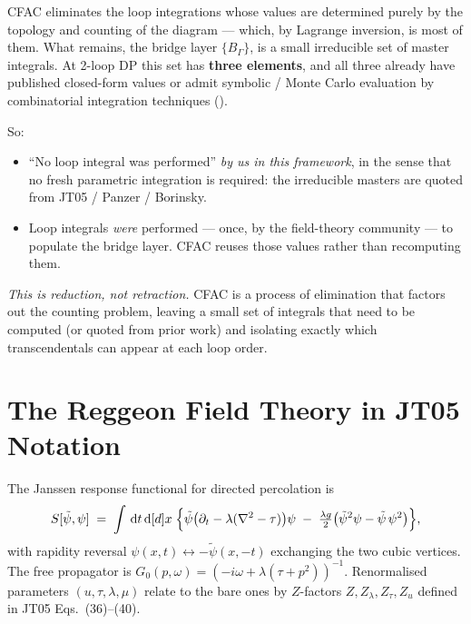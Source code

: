 \documentclass[11pt,a4paper]{article}
\newcommand{\Sact}{S}
\newcommand{\psidag}{\tilde\psi}
\renewcommand{\dd}[1]{\,\mathrm{d}#1}
\theoremstyle{definition}
\theoremstyle{plain}
\begin{document}
\begin{cfacbox}
CFAC eliminates the loop integrations whose values are determined
purely by the topology and counting of the diagram --- which, by
Lagrange inversion, is most of them.  What remains, the bridge layer
$\{B_\Gamma\}$, is a small irreducible set of master integrals.  At
2-loop DP this set has \textbf{three elements}, and all three already
have published closed-form values
\cite{JanssenTauber2005,Tauber2014} or admit symbolic / Monte Carlo
evaluation by combinatorial integration techniques
().

So:
\begin{itemize}[leftmargin=2em]
  \item ``No loop integral was performed'' \emph{by us in this
    framework}, in the sense that no fresh parametric integration is
    required: the irreducible masters are quoted from JT05 / Panzer /
    Borinsky.
  \item Loop integrals \emph{were} performed --- once, by the
    field-theory community --- to populate the bridge layer.  CFAC
    reuses those values rather than recomputing them.
\end{itemize}
\emph{This is reduction, not retraction.}  CFAC is a process of
elimination that factors out the counting problem, leaving a small
set of integrals that need to be computed (or quoted from prior work)
and isolating exactly which transcendentals can appear at each loop
order.
\end{cfacbox}

\section{The Reggeon Field Theory in JT05 Notation}
\label{sec:jt05-action}

\begin{stdbox}
The Janssen response functional for directed percolation is
\begin{equation}\label{eq:reggeon-action}
  \Sact[\psidag, \psi]
  \;=\; \int \dd t \dd[d]{x}\;\Bigl\{
    \psidag\bigl(\partial_t - \lambda(\nabla^2 - \tau)\bigr)\psi
    \;-\; \tfrac{\lambda g}{2}\bigl(\psidag^2 \psi - \psidag\,\psi^2\bigr)
    \Bigr\},
\end{equation}
with rapidity reversal $\psi(x,t) \leftrightarrow -\psidag(x,-t)$
exchanging the two cubic vertices.  The free propagator is
$G_0(p, \omega) = (-i\omega + \lambda(\tau + p^2))^{-1}$.  Renormalised
parameters $(u, \tau, \lambda, \mu)$ relate to the bare ones by
$Z$-factors $Z, Z_\lambda, Z_\tau, Z_u$ defined in JT05 Eqs.~(36)--(40).
\end{stdbox}
\end{document}
